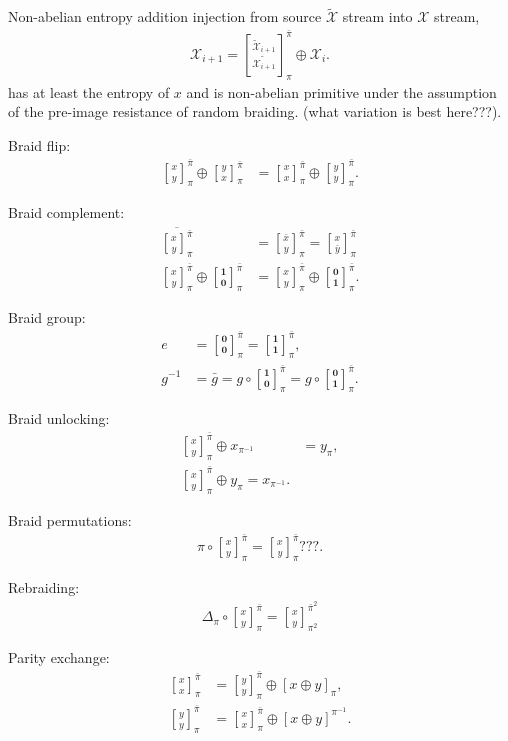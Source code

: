 \documentclass[twocolumn, aps, amsmath, amssymb, nofootinbib, superscriptaddress, longbibliography, doublefloatfix, table-of-contents, eqsecnum, rmp]{revtex4-2}
\def\zerovec{\mathbf{0}}
\def\onevec{\mathbf{1}}
\newcommand{\stackbraid}[2]{{\genfrac{[}{]}{0pt}{}{{#1}}{{#2}}}^{\bar{\pi}}_{\pi}}
\newcommand{\stackbraidpow}[3]{{\genfrac{[}{]}{0pt}{}{{#1}}{{#2}}}^{\bar{\pi}^{#3}}_{\pi^#3}}
\begin{document}
Non-abelian entropy addition injection from source $\tilde{\mathcal{X}}$ stream into $\mathcal{X}$ stream,
\begin{align}
	\mathcal{X}_{i+1} = \stackbraid{\mathcal{\tilde X}_{i+1}}{\tilde{\mathcal{X}_{i+1}}} \oplus \mathcal{X}_i.
\end{align}
has at least the entropy of $x$ and is non-abelian primitive under the assumption of the pre-image resistance of random braiding. (what variation is best here???).

Braid flip:
\begin{align}
	\stackbraid{x}{y} \oplus \stackbraid{y}{x} &= \stackbraid{x}{x} \oplus \stackbraid{y}{y}.
\end{align}

Braid complement:
\begin{align}
	\overline{\stackbraid{x}{y}} &= \stackbraid{\bar{x}}{y} = \stackbraid{x}{\bar{y}} \nonumber\\
\stackbraid{x}{y} \oplus \stackbraid{\onevec}{\zerovec} &= \stackbraid{x}{y} \oplus \stackbraid{\zerovec}{\onevec}.
\end{align}

Braid group:
\begin{align}
	e &= \stackbraid{\zerovec}{\zerovec} = \stackbraid{\onevec}{\onevec},\nonumber\\
	g^{-1} &= \bar{g} = g\circ \stackbraid{\onevec}{\zerovec} = g\circ \stackbraid{\zerovec}{\onevec}.
\end{align}

Braid unlocking:
\begin{align}
	\stackbraid{x}{y} \oplus x_{\pi^{-1}} &= y_\pi,\nonumber\\
	\stackbraid{x}{y} \oplus y_{\pi} = x_{\pi^{-1}}.
\end{align}

Braid permutations:
\begin{align}
	\pi \circ \stackbraid{x}{y} = \stackbraid{x}{y} ???.
\end{align}

Rebraiding:
\begin{align}
	\Delta_\pi \circ \stackbraid{x}{y} = \stackbraidpow{x}{y}{2}
\end{align}

Parity exchange:
\begin{align}
	\stackbraid{x}{x} &= \stackbraid{y}{y} \oplus [x\oplus y]_\pi,\nonumber\\
	\stackbraid{y}{y} &= \stackbraid{x}{x} \oplus [x\oplus y]^{\pi^{-1}}.
\end{align}
\end{document}

